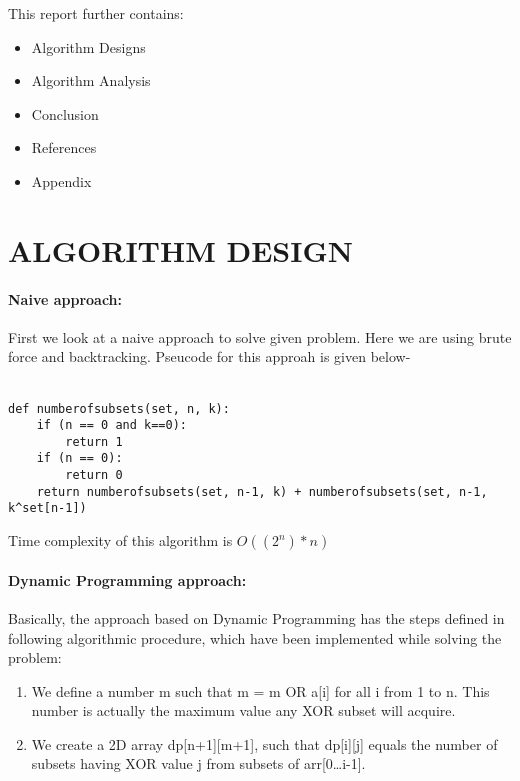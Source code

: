 \documentclass[10pt]{article}
\begin{document}
\begin{multicols*}{2}
This report further contains:
\begin{itemize}
\item 	Algorithm  Designs
\item 	Algorithm  Analysis
\item 	Conclusion
\item 	References
\item 	Appendix
\end{itemize}

\section*{ALGORITHM DESIGN}

\paragraph{Naive approach:}
First we look at a naive approach to solve given problem. Here we are using brute force and backtracking. Pseucode for this approah is given below-\\\\

\begin{lstlisting}
def numberofsubsets(set, n, k):
    if (n == 0 and k==0):
        return 1
    if (n == 0):
        return 0
    return numberofsubsets(set, n-1, k) + numberofsubsets(set, n-1, k^set[n-1])

\end{lstlisting}


Time complexity of this algorithm is \(O((2^n )* n)\)


\paragraph{Dynamic Programming approach:}

Basically, the approach based on Dynamic Programming has the steps defined in following algorithmic procedure, which have been implemented while solving the problem:
\begin{enumerate}

\item	We define a number m such that m = m OR a[i] for all i from 1 to n. This number is actually the maximum value any XOR subset will acquire.

\item	 We create a 2D array dp[n+1][m+1], such that dp[i][j] equals the number of subsets having XOR value j from subsets of arr[0…i-1].


\end{enumerate}
\end{multicols*}
\end{document}
